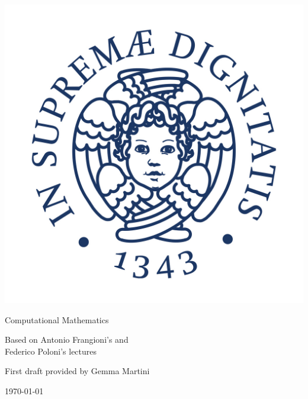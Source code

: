 \documentclass[12pt]{article}
\theoremstyle{thm}
\theoremstyle{def}
\theoremstyle{definition}
\begin{document}
\begin{titlepage}
\begin{center}
\vspace{3cm}

\Large

\vspace{2cm}

\includegraphics[scale=0.3]{Cherubino.jpg}

\vspace{2.5cm}

{\Huge \sc Computational Mathematics}

\vspace{2cm}
Based on Antonio Frangioni's and\\
  Federico Poloni's lectures

\vspace{2cm}
First draft provided by Gemma Martini
\vfill

\today

\end{center}
\end{titlepage}


\tableofcontents
\newpage


\end{document}
